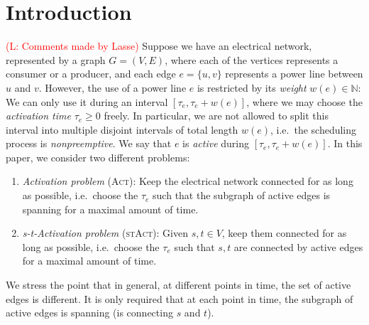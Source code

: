 \documentclass[runningheads]{llncs}
\numberwithin{equation}{section}
\newcommand{\N}{\mathbb{N}}
\newcommand{\comment}[1]{\textcolor{red}{(L: #1)}}
\newcommand{\act}{\textsc{(Act)}}
\newcommand{\stact}{\textsc{(stAct)}}
\begin{document}
\section{Introduction}
\comment{Comments made by Lasse}
Suppose we have an electrical network, represented by a graph $G = (V,E)$, where each of the vertices represents a consumer or a producer, and each edge $e = \{u,v\}$ represents a power line between $u$ and $v$. However, the use of a power line $e$ is restricted by its \emph{weight} $w(e) \in \N$: We can only use it during an interval $[\tau_e, \tau_e + w(e)]$, where we may choose the \emph{activation time} $\tau_e \geq 0$ freely. In particular, we are not allowed to split this interval into multiple disjoint intervals of total length $w(e)$, i.e.\ the scheduling process is \emph{nonpreemptive}. We say that $e$ is \emph{active} during $[\tau_e, \tau_e + w(e)]$. In this paper, we consider two different problems:
\begin{enumerate}
\item \emph{Activation problem} \act: Keep the electrical network connected for as long as possible, i.e.\ choose the $\tau_e$ such that the subgraph of active edges is spanning for a maximal amount of time. 
\item \emph{s-t-Activation problem} \stact: Given $s, t \in V$, keep them connected for as long as possible, i.e.\ choose the $\tau_e$ such that $s, t$ are connected by active edges for a maximal amount of time.
\end{enumerate}

We stress the point that in general, at different points in time, the set of active edges is different. It is only required that at each point in time, the subgraph of active edges is spanning (is connecting $s$ and $t$). 
\end{document}
